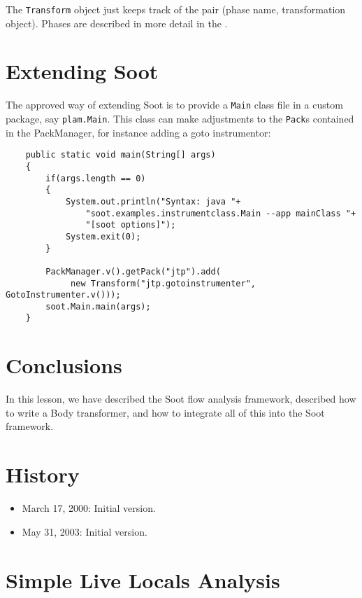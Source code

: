 \documentclass{article}
\begin{document}
The {\tt Transform} object just keeps track of the pair (phase name,
transformation object).  Phases are described in more detail in the
.

\section{Extending Soot}

The approved way of extending Soot is to provide a {\tt Main} class file
in a custom package, say {\tt plam.Main}.  This class can make adjustments
to the {\tt Pack}s contained in the PackManager, for instance adding a
goto instrumentor:

\begin{verbatim}
    public static void main(String[] args) 
    {
        if(args.length == 0)
        {
            System.out.println("Syntax: java "+
                "soot.examples.instrumentclass.Main --app mainClass "+
                "[soot options]");
            System.exit(0);
        }            
        
        PackManager.v().getPack("jtp").add(
             new Transform("jtp.gotoinstrumenter", GotoInstrumenter.v()));
        soot.Main.main(args);
    }
\end{verbatim}

\section{Conclusions}

In this lesson, we have described the Soot flow analysis framework,
described how to write a Body transformer, and how to integrate all of
this into the Soot framework.

\section{History}

\begin{itemize}
\item March 17, 2000: Initial version.
\item May 31, 2003: Initial version.
\end{itemize}

\appendix

\section*{Simple Live Locals Analysis}
\label{simpleAnalysis}
\end{document}
